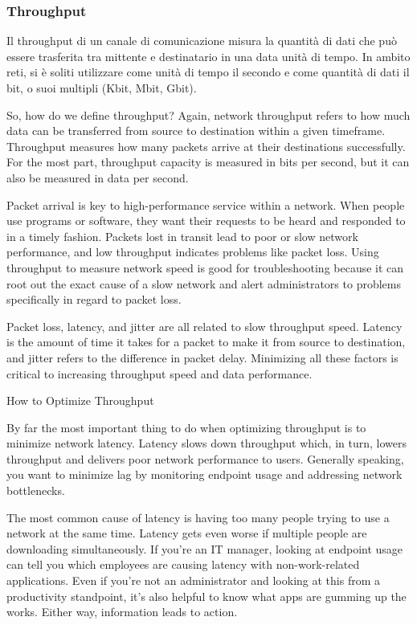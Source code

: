 \subsubsection{Throughput}
Il throughput di un canale di comunicazione misura la quantità di dati che può essere trasferita tra mittente e destinatario in una data unità di tempo. In ambito reti, si è soliti utilizzare come unità di tempo il secondo e come quantità di dati il bit, o suoi multipli (Kbit, Mbit, Gbit).

So, how do we define throughput? Again, network throughput refers to how much data can be transferred from source to destination within a given timeframe. Throughput measures how many packets arrive at their destinations successfully. For the most part, throughput capacity is measured in bits per second, but it can also be measured in data per second. 

Packet arrival is key to high-performance service within a network. When people use programs or software, they want their requests to be heard and responded to in a timely fashion. Packets lost in transit lead to poor or slow network performance, and low throughput indicates problems like packet loss. Using throughput to measure network speed is good for troubleshooting because it can root out the exact cause of a slow network and alert administrators to problems specifically in regard to packet loss.

Packet loss, latency, and jitter are all related to slow throughput speed. Latency is the amount of time it takes for a packet to make it from source to destination, and jitter refers to the difference in packet delay. Minimizing all these factors is critical to increasing throughput speed and data performance.

How to Optimize Throughput

By far the most important thing to do when optimizing throughput is to minimize network latency. Latency slows down throughput which, in turn, lowers throughput and delivers poor network performance to users. Generally speaking, you want to minimize lag by monitoring endpoint usage and addressing network bottlenecks.

The most common cause of latency is having too many people trying to use a network at the same time. Latency gets even worse if multiple people are downloading simultaneously. If you’re an IT manager, looking at endpoint usage can tell you which employees are causing latency with non-work-related applications. Even if you’re not an administrator and looking at this from a productivity standpoint, it’s also helpful to know what apps are gumming up the works. Either way, information leads to action.

